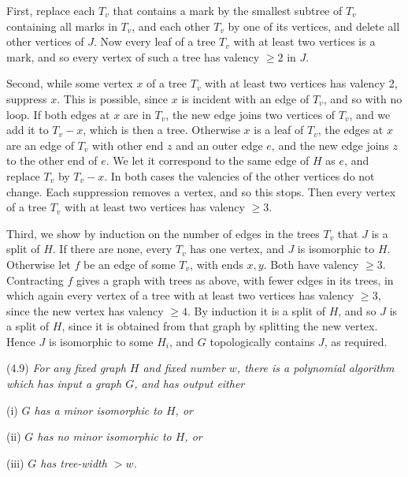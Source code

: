 {First, replace each $T_v$ that contains a mark by the smallest subtree of $T_v$ containing all marks
in $T_v$, and each other $T_v$ by one of its vertices, and delete all other vertices of $J$. Now every
leaf of a tree $T_v$ with at least two vertices is a mark, and so every vertex of such a tree has
valency $\ge 2$ in $J$.

Second, while some vertex $x$ of a tree $T_v$ with at least two vertices has valency 2, suppress $x$.
This is possible, since $x$ is incident with an edge of $T_v$, and so with no loop. If both edges at
$x$ are in $T_v$, the new edge joins two vertices of $T_v$, and we add it to $T_v - x$, which is then a
tree. Otherwise $x$ is a leaf of $T_v$, the edges at $x$ are an edge of $T_v$ with other end $z$ and an
outer edge $e$, and the new edge joins $z$ to the other end of $e$. We let it correspond to the same
edge of $H$ as $e$, and replace $T_v$ by $T_v - x$. In both cases the valencies of the other vertices
do not change. Each suppression removes a vertex, and so this stops. Then every vertex of a tree $T_v$
with at least two vertices has valency $\ge 3$.

Third, we show by induction on the number of edges in the trees $T_v$ that $J$ is a split of $H$. If
there are none, every $T_v$ has one vertex, and $J$ is isomorphic to $H$. Otherwise let $f$ be an edge
of some $T_v$, with ends $x, y$. Both have valency $\ge 3$. Contracting $f$ gives a graph with trees as above, with
fewer edges in its trees, in which again every vertex of a tree with at least two vertices has valency
$\ge 3$, since the new vertex has valency $\ge 4$. By induction it
is a split of $H$, and so $J$ is a split of $H$, since it is obtained from that graph by splitting the
new vertex. Hence $J$ is isomorphic to some $H_i$, and $G$ topologically contains $J$, as
required.}

\stmt
(4.9) \textit{For any fixed graph $H$ and fixed number $w$, there is a polynomial algorithm which has input a graph $G$, and has output either}

\hspace*{12pt}(i) \textit{$G$ has a minor isomorphic to $H$, or}

\hspace*{12pt}(ii) \textit{$G$ has no minor isomorphic to $H$, or}

\hspace*{12pt}(iii) \textit{$G$ has tree-width $> w$.}

